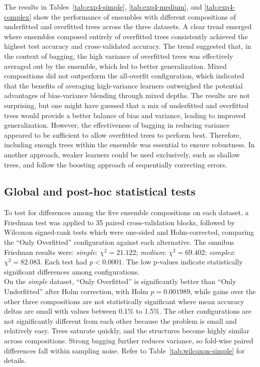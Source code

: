 \documentclass[conference]{IEEEtran}
\begin{document}
 The results in Tables~\ref{tab:exp4-simple}, \ref{tab:exp4-medium}, and \ref{tab:exp4-complex} show the performance of ensembles with different compositions of underfitted and overfitted trees across the three datasets. A clear trend emerged where ensembles composed entirely of overfitted trees consistently achieved the highest test accuracy and cross-validated accuracy. The trend suggested that, in the context of bagging, the high variance of overfitted trees was effectively averaged out by the ensemble, which led to better generalization. Mixed compositions did not outperform the all-overfit configuration, which indicated that the benefits of averaging high-variance learners outweighed the potential advantages of bias-variance blending through mixed depths. The results are not surprising, but one might have guessed that a mix of underfitted and overfitted trees would provide a better balance of bias and variance, leading to improved generalization. However, the effectiveness of bagging in reducing variance appeared to be sufficient to allow overfitted trees to perform best. Therefore, including enough trees within the ensemble was essential to ensure robustness. In another approach, weaker learners could be used exclusively, such as shallow trees, and follow the boosting approach of sequentially correcting errors. 

 \subsection{Global and post-hoc statistical tests}
To test for differences among the five ensemble compositions on each dataset, a Friedman test was applied to 35 paired cross-validation blocks, followed by Wilcoxon signed-rank tests which were one-sided and Holm-corrected, comparing the ``Only Overfitted'' configuration against each alternative. The omnibus Friedman results were: \textit{simple}: $\chi^2=21.122$; \textit{medium}: $\chi^2=69.402$; \textit{complex}: $\chi^2=82.083$. Each test had $p<0.0001$. The low p-values indicate statistically significant differences among configurations.\\

 On the \textit{simple} dataset, ``Only Overfitted'' is significantly better than ``Only Underfitted'' after Holm correction, with Holm $p=0.001989$, while gains over the other three compositions are not statistically significant where mean accuracy deltas are small with values between 0.1\% to 1.5\%. The other configurations are not significantly different from each other because the problem is small and relatively easy. Trees saturate quickly, and the structures become highly similar across compositions. Strong bagging further reduces variance, so fold-wise paired differences fall within sampling noise. Refer to Table~\ref{tab:wilcoxon-simple} for details.\\
\end{document}
